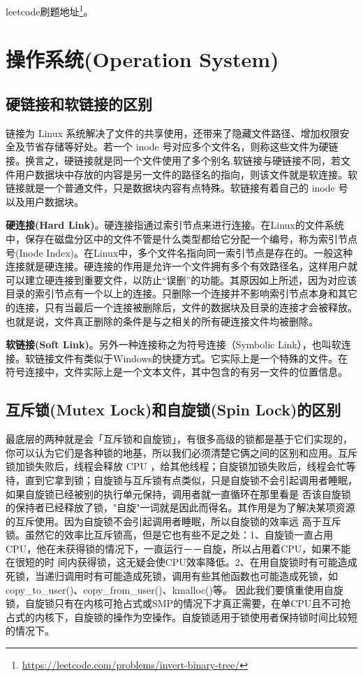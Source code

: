 \documentclass[../../../interview-questions.tex]{subfiles}
\begin{document}
leetcode刷题地址\footnote{\url{https://leetcode.com/problems/invert-binary-tree/}}。


\section{操作系统(Operation System)}

\subsection{硬链接和软链接的区别}

链接为 Linux 系统解决了文件的共享使用，还带来了隐藏文件路径、增加权限安全及节省存储等好处。若一个 inode 号对应多个文件名，则称这些文件为硬链接。换言之，硬链接就是同一个文件使用了多个别名.软链接与硬链接不同，若文件用户数据块中存放的内容是另一文件的路径名的指向，则该文件就是软连接。软链接就是一个普通文件，只是数据块内容有点特殊。软链接有着自己的 inode 号以及用户数据块。

\textbf{硬连接(Hard Link)}。硬连接指通过索引节点来进行连接。在Linux的文件系统中，保存在磁盘分区中的文件不管是什么类型都给它分配一个编号，称为索引节点号(Inode Index)。在Linux中，多个文件名指向同一索引节点是存在的。一般这种连接就是硬连接。硬连接的作用是允许一个文件拥有多个有效路径名，这样用户就可以建立硬连接到重要文件，以防止“误删”的功能。其原因如上所述，因为对应该目录的索引节点有一个以上的连接。只删除一个连接并不影响索引节点本身和其它的连接，只有当最后一个连接被删除后，文件的数据块及目录的连接才会被释放。也就是说，文件真正删除的条件是与之相关的所有硬连接文件均被删除。

\textbf{软链接(Soft Link)}。另外一种连接称之为符号连接（Symbolic Link），也叫软连接。软链接文件有类似于Windows的快捷方式。它实际上是一个特殊的文件。在符号连接中，文件实际上是一个文本文件，其中包含的有另一文件的位置信息。


\subsection{互斥锁(Mutex Lock)和自旋锁(Spin Lock)的区别}

最底层的两种就是会「互斥锁和自旋锁」，有很多高级的锁都是基于它们实现的，你可以认为它们是各种锁的地基，所以我们必须清楚它俩之间的区别和应用。互斥锁加锁失败后，线程会释放 CPU ，给其他线程；自旋锁加锁失败后，线程会忙等待，直到它拿到锁；自旋锁与互斥锁有点类似，只是自旋锁不会引起调用者睡眠，如果自旋锁已经被别的执行单元保持，调用者就一直循环在那里看是 否该自旋锁的保持者已经释放了锁，"自旋"一词就是因此而得名。其作用是为了解决某项资源的互斥使用。因为自旋锁不会引起调用者睡眠，所以自旋锁的效率远 高于互斥锁。虽然它的效率比互斥锁高，但是它也有些不足之处：1、自旋锁一直占用CPU，他在未获得锁的情况下，一直运行－－自旋，所以占用着CPU，如果不能在很短的时 间内获得锁，这无疑会使CPU效率降低。2、在用自旋锁时有可能造成死锁，当递归调用时有可能造成死锁，调用有些其他函数也可能造成死锁，如 copy\_to\_user()、copy\_from\_user()、kmalloc()等。
因此我们要慎重使用自旋锁，自旋锁只有在内核可抢占式或SMP的情况下才真正需要，在单CPU且不可抢占式的内核下，自旋锁的操作为空操作。自旋锁适用于锁使用者保持锁时间比较短的情况下。
\end{document}
